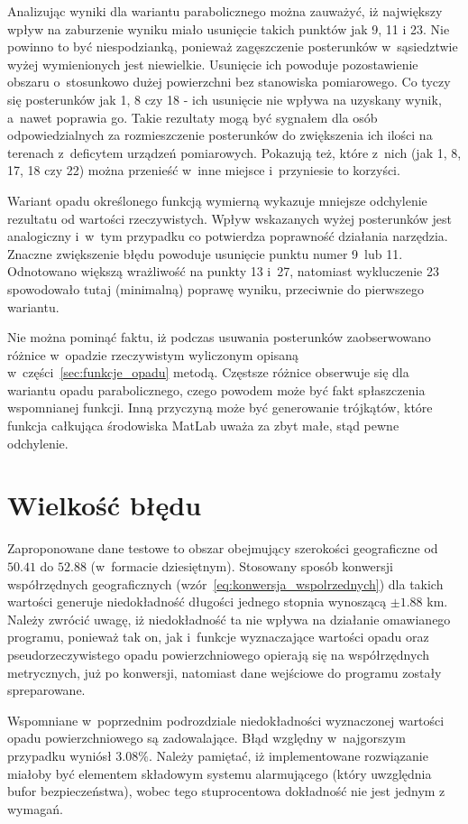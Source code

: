 Analizując wyniki dla wariantu parabolicznego można zauważyć, iż największy wpływ na zaburzenie wyniku miało usunięcie takich punktów jak 9, 11 i 23. Nie powinno to być niespodzianką, ponieważ zagęszczenie posterunków w~sąsiedztwie wyżej wymienionych jest niewielkie. Usunięcie ich powoduje pozostawienie obszaru o~stosunkowo dużej powierzchni bez stanowiska pomiarowego. Co tyczy się posterunków jak 1, 8 czy 18 - ich usunięcie nie wpływa na uzyskany wynik, a~nawet poprawia go. Takie rezultaty mogą być sygnałem dla osób odpowiedzialnych za rozmieszczenie posterunków do zwiększenia ich ilości na terenach z~deficytem urządzeń pomiarowych. Pokazują też, które z~nich (jak 1, 8, 17, 18 czy 22) można przenieść w~inne miejsce i~przyniesie to korzyści.


Wariant opadu określonego funkcją wymierną wykazuje mniejsze odchylenie rezultatu od wartości rzeczywistych. Wpływ wskazanych wyżej posterunków jest analogiczny i~w~tym przypadku co potwierdza poprawność działania narzędzia. Znaczne zwiększenie błędu powoduje usunięcie punktu numer 9~lub 11. Odnotowano większą wrażliwość na punkty 13 i~27, natomiast wykluczenie 23 spowodowało tutaj (minimalną) poprawę wyniku, przeciwnie do pierwszego wariantu.

Nie można pominąć faktu, iż podczas usuwania posterunków zaobserwowano różnice w~opadzie rzeczywistym wyliczonym opisaną w~części~\ref{sec:funkcje_opadu} metodą. Częstsze różnice obserwuje się dla wariantu opadu parabolicznego, czego powodem może być fakt spłaszczenia wspomnianej funkcji. Inną przyczyną może być generowanie trójkątów, które funkcja całkująca środowiska MatLab uważa za zbyt małe, stąd pewne odchylenie.

\section{Wielkość błędu}
Zaproponowane dane testowe to obszar obejmujący szerokości geograficzne od $50.41$ do $52.88$ (w~formacie dziesiętnym). Stosowany sposób konwersji współrzędnych geograficznych (wzór~\ref{eq:konwersja_wspolrzednych}) dla takich wartości generuje niedokładność długości jednego stopnia wynoszącą $\pm 1.88$ km. Należy zwrócić uwagę, iż niedokładność ta nie wpływa na działanie omawianego programu, ponieważ tak on, jak i~funkcje wyznaczające wartości opadu oraz pseudorzeczywistego opadu powierzchniowego opierają się na współrzędnych metrycznych, już po konwersji, natomiast dane wejściowe do programu zostały spreparowane.  

Wspomniane w~poprzednim podrozdziale niedokładności wyznaczonej wartości opadu powierzchniowego są zadowalające. Błąd względny w~najgorszym przypadku wyniósł $3.08\%$. Należy pamiętać, iż implementowane rozwiązanie miałoby być elementem składowym systemu alarmującego (który uwzględnia bufor bezpieczeństwa), wobec tego stuprocentowa dokładność nie jest jednym z wymagań.

